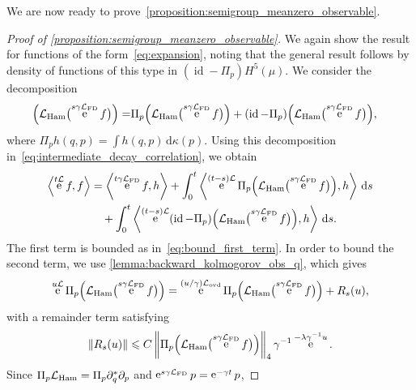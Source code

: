 \documentclass[11pt,a4paper]{article}
\DeclareMathOperator{\e}{e}
\DeclareMathOperator{\id}{id}
\renewcommand{\d}{\mathrm d}
\theoremstyle{plain}
\numberwithin{equation}{section}
\renewcommand{\leq}{\leqslant}
\begin{document}
We are now ready to prove~\cref{proposition:semigroup_meanzero_observable}.
\begin{proof}
    [Proof of \cref{proposition:semigroup_meanzero_observable}]
    We again show the result for functions of the form~\eqref{eq:expansion},
    noting that the general result follows by density of functions of this type in $(\id - \Pi_p) H^5(\mu)$.
    We consider the decomposition
    \begin{align}
        \label{eq:decomposition}
        \Bigl( \mathcal L_{\rm Ham} \bigl(\e^{s \gamma \mathcal L_{\rm FD}} f\bigr) \Bigr)
         =& \Pi_p \Bigl( \mathcal L_{\rm Ham} \bigl(\e^{s \gamma \mathcal L_{\rm FD}} f\bigr) \Bigr)
         + (\id - \Pi_p) \Bigl( \mathcal L_{\rm Ham} \bigl(\e^{s \gamma \mathcal L_{\rm FD}} f\bigr) \Bigr),
    \end{align}
    where $\Pi_p h(q, p) = \int h(q, p) \, \d \kappa(p)$.
    Using this decomposition in~\eqref{eq:intermediate_decay_correlation},
    we obtain
    \begin{align}
        \notag
        \ip{\e^{t \mathcal L} f}{f}
        &= \ip{\e^{t \gamma \mathcal L_{\rm FD}} f}{h}
        + \int_{0}^t \ip{\e^{(t-s) \mathcal L} \Pi_p \Bigl( \mathcal L_{\rm Ham} \bigl(\e^{s \gamma \mathcal L_{\rm FD}} f\bigr) \Bigr)}{h} \, \d s\\
        \label{eq:intermediate_decay_correlation_2}
        &\quad + \int_{0}^t \ip{\e^{(t-s) \mathcal L} (\id - \Pi_p) \Bigl( \mathcal L_{\rm Ham} \bigl(\e^{s \gamma \mathcal L_{\rm FD}} f\bigr) \Bigr)}{h} \, \d s.
    \end{align}
    The first term is bounded as in~\eqref{eq:bound_first_term}.
    In order to bound the second term,
    we use \cref{lemma:backward_kolmogorov_obs_q},
    which gives
    \begin{equation}
        \label{eq:semigroup_on_q_part}
        \e^{u \mathcal L} \Pi_p \Bigl( \mathcal L_{\rm Ham} \bigl(\e^{s \gamma \mathcal L_{\rm FD}} f\bigr) \Bigr)
        =  \e^{(u/\gamma) \mathcal L_{\rm ovd}} \Pi_p \Bigl( \mathcal L_{\rm Ham} \bigl(\e^{s \gamma \mathcal L_{\rm FD}} f\bigr) \Bigr) + R_s(u),
    \end{equation}
    with a remainder term satisfying
    \begin{equation}
        \label{eq:bound_remainder}
        \norm{R_s(u)} \leq C \norm{\Pi_p \Bigl( \mathcal L_{\rm Ham} \bigl(\e^{s \gamma \mathcal L_{\rm FD}} f\bigr) \Bigr)}[4] \gamma^{-1} \e^{-\lambda \gamma^{-1} u}.
    \end{equation}
    Since $\Pi_p \mathcal L_{\rm Ham} = \Pi_p \partial_q^*\partial_p$ and $\e^{s \gamma \mathcal L_{\rm FD}} p = \e^{-\gamma t}p$,

\end{proof}
\end{document}
